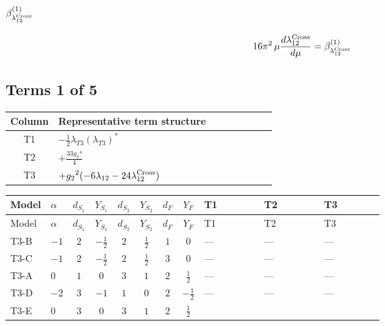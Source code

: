 \documentclass[8pt]{article}
\begin{document}
\begin{landscape}
\section*{$\beta_{\lambda_{12}^{\rm Cross}}^{(1)}$}
\[16\pi^2\,\mu\frac{d \lambda_{12}^{\rm Cross}}{d\mu}=\beta_{\lambda_{12}^{\rm Cross}}^{(1)}\]
\subsection*{Terms 1 of 5}
\begin{center}
\begin{tabular}{@{}c >{\raggedright\arraybackslash}p{0.82\linewidth}@{}}
\toprule
Column & Representative term structure \\
\midrule
T1 & \(\displaystyle -\frac{1}{2} {\lambda_{T3}} \left({\lambda_{T3}}\right)^{*}\) \\
\midrule
T2 & \(\displaystyle +\frac{33 {g_2}^4}{4}\) \\
\midrule
T3 & \(\displaystyle +{g_2}^2 (-6 {\lambda_{12}}-24 {\lambda_{12}^{\rm Cross}})\) \\
\midrule
\bottomrule
\end{tabular}
\end{center}
\smallskip
\tiny
\begin{longtable}{@{}llcccccc >{\raggedright\arraybackslash}p{0.21\linewidth} >{\raggedright\arraybackslash}p{0.21\linewidth} >{\raggedright\arraybackslash}p{0.21\linewidth}@{}}
\toprule
Model & $\alpha$ & $d_{S_1}$ & $Y_{S_1}$ & $d_{S_2}$ & $Y_{S_2}$ & $d_F$ & $Y_F$ & T1 & T2 & T3 \\
\midrule
\endfirsthead
\toprule
Model & $\alpha$ & $d_{S_1}$ & $Y_{S_1}$ & $d_{S_2}$ & $Y_{S_2}$ & $d_F$ & $Y_F$ & T1 & T2 & T3 \\
\midrule
\endhead
T3-B & $-1$ & $2$ & $-\frac{1}{2}$ & $2$ & $\frac{1}{2}$ & $1$ & $0$ & --- & --- & --- \\
\midrule
T3-C & $-1$ & $2$ & $-\frac{1}{2}$ & $2$ & $\frac{1}{2}$ & $3$ & $0$ & --- & --- & --- \\
\midrule
T3-A & $0$ & $1$ & $0$ & $3$ & $1$ & $2$ & $\frac{1}{2}$ & --- & --- & --- \\
\midrule
T3-D & $-2$ & $3$ & $-1$ & $1$ & $0$ & $2$ & $-\frac{1}{2}$ & --- & --- & --- \\
\midrule
T3-E & $0$ & $3$ & $0$ & $3$ & $1$ & $2$ & $\frac{1}{2}$ & \scriptsize\adjustbox{max width=\linewidth}{$\begin{gathered} -\frac{1}{2} {\lambda_{T3}} \left({\lambda_{T3}}\right)^{*}\end{gathered}$} & \scriptsize\adjustbox{max width=\linewidth}{$\begin{gathered} +\frac{33 {g_2}^4}{4}\end{gathered}$} & \scriptsize\adjustbox{max width=\linewidth}{$\begin{gathered} +{g_2}^2 (-6 {\lambda_{12}}-24 {\lambda_{12}^{\rm Cross}})\end{gathered}$} \\
\midrule
\bottomrule
\end{longtable}
\clearpage

\end{landscape}
\end{document}

